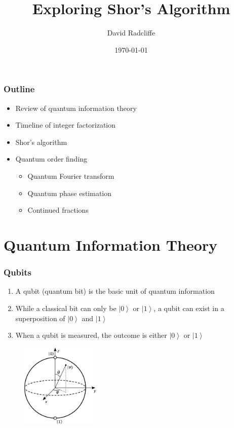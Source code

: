 \documentclass{beamer}
\title{Exploring Shor's Algorithm}
\author{David Radcliffe}
\institute{MinneQuantum}
\date{\today}
\begin{document}
\newcommand{\ket}[1]{\left| #1 \right\rangle}

\frame{\titlepage}


\begin{frame}
    \frametitle{Outline}
    \begin{itemize}
        \item Review of quantum information theory
        \item Timeline of integer factorization
        \item Shor's algorithm
        \item Quantum order finding
        \begin{itemize}
            \item Quantum Fourier transform
            \item Quantum phase estimation
            \item Continued fractions
        \end{itemize}
    \end{itemize}
\end{frame}

\section{Quantum Information Theory}

\begin{frame}
\frametitle{Qubits}

\begin{enumerate}
    \item A qubit (quantum bit) is the basic unit of quantum 
    information
    \item While a classical bit can only be $\ket0$ or $\ket1$, 
    a qubit can exist in a superposition of $\ket0$ and $\ket1$
    \item When a qubit is measured, the outcome is either 
    $\ket0$ or $\ket1$
\end{enumerate}
\begin{figure}
\includegraphics[height=4cm]{Bloch_sphere.svg.png}
\end{figure}
\end{frame}
\end{document}
